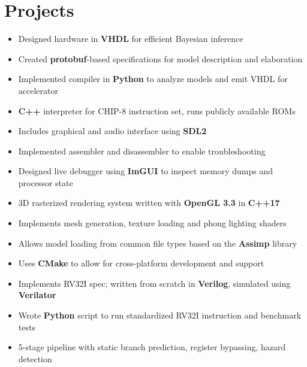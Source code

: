 \documentclass{moderncv}
\begin{document}
\section{Projects}
{\begin{itemize}
    \item Designed hardware in \textbf{VHDL} for efficient Bayesian inference
    \item Created \textbf{protobuf}-based specifications for model description and elaboration
    \item Implemented compiler in \textbf{Python} to analyze models and emit VHDL for accelerator
\end{itemize}}

{\begin{itemize}
    \item \textbf{C++} interpreter for CHIP-8 instruction set, runs publicly available ROMs
    \item Includes graphical and audio interface using \textbf{SDL2}
    \item Implemented assembler and disassembler to enable troubleshooting
    \item Designed live debugger using \textbf{ImGUI} to inspect memory dumps and processor state
\end{itemize}}

{\begin{itemize}
    \item 3D rasterized rendering system written with \textbf{OpenGL 3.3} in \textbf{C++17}
    \item Implements mesh generation, texture loading and phong lighting shaders
    \item Allows model loading from common file types based on the \textbf{Assimp} library
    \item Uses \textbf{CMake} to allow for cross-platform development and support
\end{itemize}}

{\begin{itemize}
    \item Implements RV32I spec; written from scratch in \textbf{Verilog}, simulated using \textbf{Verilator}
    \item Wrote \textbf{Python} script to run standardized RV32I instruction and benchmark tests
    \item 5-stage pipeline with static branch prediction, register bypassing, hazard detection
\end{itemize}}
\end{document}
